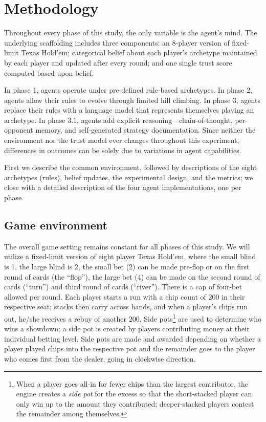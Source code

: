 \documentclass[journal]{IEEEtran}
\begin{document}
\section{Methodology}

Throughout every phase of this study, the only variable is the
agent's mind. The underlying scaffolding includes three components:
an 8-player version of fixed-limit Texas Hold'em; categorical belief
about each player's archetype maintained by each player and updated
after every round; and one single trust score computed based upon
belief.

In phase 1, agents operate under pre-defined rule-based archetypes.
In phase 2, agents allow their rules to evolve through limited hill
climbing. In phase 3, agents replace their rules with a language
model that represents themselves playing an archetype. In phase 3.1,
agents add explicit reasoning---chain-of-thought, per-opponent
memory, and self-generated strategy documentation. Since neither the
environment nor the trust model ever changes throughout this
experiment, differences in outcomes can be solely due to variations
in agent capabilities.

First we describe the common environment, followed by descriptions
of the eight archetypes (rules), belief updates, the experimental
design, and the metrics; we close with a detailed description of the
four agent implementations, one per phase.

\subsection{Game environment}
The overall game setting remains constant for all phases of this
study. We will utilize a fixed-limit version of eight player Texas
Hold'em, where the small blind is 1, the large blind is 2, the small
bet (2) can be made pre-flop or on the first round of cards (the
``flop''), the large bet (4) can be made on the
second round of cards (``turn'') and third round of cards
(``river''). There is a cap of four-bet allowed per round. Each player starts a run with a chip count of 200 in their
respective seat; stacks then carry across hands, and when a player's
chips run out, he/she receives a rebuy of another 200. Side
pots\footnote{When a player goes all-in for fewer chips than the
largest contributor, the engine creates a \textit{side pot} for the
excess so that the short-stacked player can only win up to the
amount they contributed; deeper-stacked players contest the
remainder among themselves.} are used to determine who wins a
showdown; a side pot is created by
players contributing money at their individual betting level. Side
pots are made and awarded depending on whether a player played chips
into the respective pot and the remainder goes to the player who
comes first from the dealer, going in clockwise direction.
\end{document}
